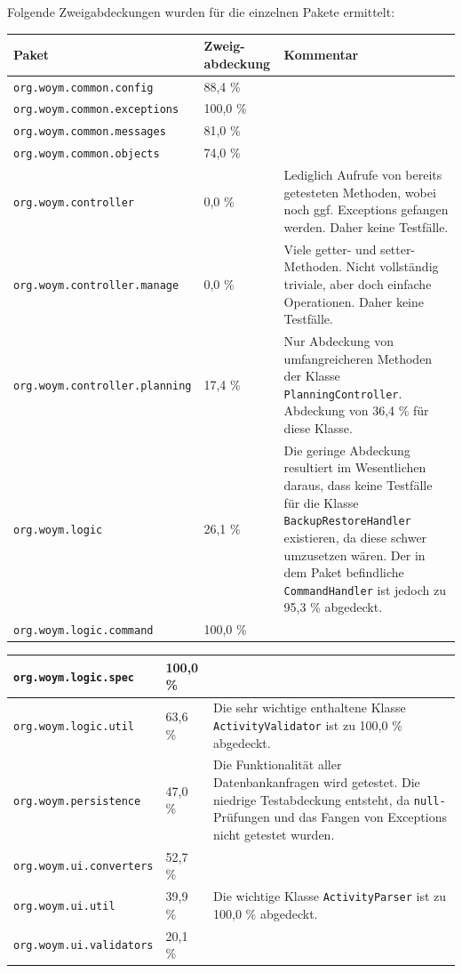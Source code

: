 \documentclass[fontsize=12pt,paper=a4,twoside]{scrartcl}
\renewcommand{\arraystretch}{1.2}
\begin{document}
Folgende Zweigabdeckungen wurden für die einzelnen Pakete ermittelt:

\renewcommand{\arraystretch}{1.3}
\begin{tabularx}{\textwidth}{|X|p{2cm}|X|}
\hline
\textbf{Paket} & \textbf{Zweig-abdeckung} & \textbf{Kommentar} \\\hline
\texttt{org.woym.common.config} & 88,4 \% & \\\hline
\texttt{org.woym.common.exceptions} & 100,0 \% & \\\hline
\texttt{org.woym.common.messages} & 81,0 \% & \\\hline
\texttt{org.woym.common.objects} & 74,0 \% &  \\\hline
\texttt{org.woym.controller} & 0,0 \% & Lediglich Aufrufe von bereits getesteten Methoden, wobei noch ggf. Exceptions gefangen werden. Daher keine Testfälle.\\\hline
\texttt{org.woym.controller.manage} & 0,0 \% & Viele getter- und setter-Methoden. Nicht vollständig triviale, aber doch einfache Operationen. Daher keine Testfälle. \\\hline
\texttt{org.woym.controller.planning} & 17,4 \% & Nur Abdeckung von umfangreicheren Methoden der Klasse \texttt{PlanningController}. Abdeckung von 36,4 \% für diese Klasse.\\\hline
\texttt{org.woym.logic} & 26,1 \% & Die geringe Abdeckung resultiert im Wesentlichen daraus, dass keine Testfälle für die Klasse \texttt{BackupRestoreHandler} existieren, da diese schwer umzusetzen wären. Der in dem Paket befindliche \texttt{CommandHandler} ist jedoch zu 95,3 \% abgedeckt.\\\hline
\texttt{org.woym.logic.command} & 100,0 \% & \\\hline
\end{tabularx}

\begin{tabularx}{\textwidth}{|X|p{2cm}|X|}
\hline
\texttt{org.woym.logic.spec} & 100,0 \% & \\\hline
\texttt{org.woym.logic.util} & 63,6 \% & Die sehr wichtige enthaltene Klasse \texttt{ActivityValidator} ist zu 100,0 \% abgedeckt.\\\hline
\texttt{org.woym.persistence} & 47,0 \% & Die Funktionalität aller Datenbankanfragen wird getestet. Die niedrige Testabdeckung entsteht, da \texttt{null-}Prüfungen und das Fangen von Exceptions nicht getestet wurden. \\\hline
\texttt{org.woym.ui.converters} & 52,7 \% & \\\hline
\texttt{org.woym.ui.util} & 39,9 \% & Die wichtige Klasse \texttt{ActivityParser} ist zu 100,0 \% abgedeckt.\\\hline
\texttt{org.woym.ui.validators} & 20,1 \% & \\\hline
\end{tabularx}
\end{document}
